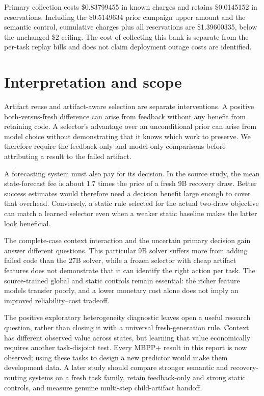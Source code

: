 \documentclass[10pt,twocolumn]{article}
\begin{document}
Primary collection costs \$0.83799455 in known charges and retains
\$0.0145152 in reservations. Including the \$0.5149634 prior campaign upper
amount and the semantic control, cumulative charges plus all reservations are
\$1.39600335, below the unchanged \$2 ceiling. The cost of collecting this bank
is separate from the per-task replay bills and does not claim deployment
outage costs are identified.

\section{Interpretation and scope}

Artifact reuse and artifact-aware selection are separate interventions.
A positive both-versus-fresh difference can arise from feedback without any
benefit from retaining code. A selector's advantage over an unconditional prior
can arise from model choice without demonstrating that it knows which work to
preserve. We therefore require the feedback-only and model-only comparisons
before attributing a result to the failed artifact.

A forecasting system must also pay for its decision. In the source study,
the mean state-forecast fee is about 1.7 times the price of a fresh 9B recovery
draw. Better success estimates would therefore need a decision benefit large
enough to cover that overhead. Conversely, a static rule selected for the actual
two-draw objective can match a learned selector even when a weaker static
baseline makes the latter look beneficial.

The complete-case context interaction and the uncertain primary decision gain
answer different questions. This particular 9B solver suffers more from adding
failed code than the 27B solver, while a frozen selector with cheap artifact
features does not demonstrate that it can identify the right action per task.
The source-trained global and static controls remain essential: the richer
feature models transfer poorly, and a lower monetary cost alone does not imply
an improved reliability--cost tradeoff.

The positive exploratory heterogeneity diagnostic leaves open a useful research
question, rather than closing it with a universal fresh-generation rule.
Context has different observed value across states, but learning that value
economically requires another task-disjoint test. Every MBPP+ result in this
report is now observed; using these tasks to design a new predictor would make
them development data. A later study should compare stronger semantic and
recovery-routing systems on a fresh task family, retain feedback-only and
strong static controls, and measure genuine multi-step child-artifact handoff.
\end{document}
